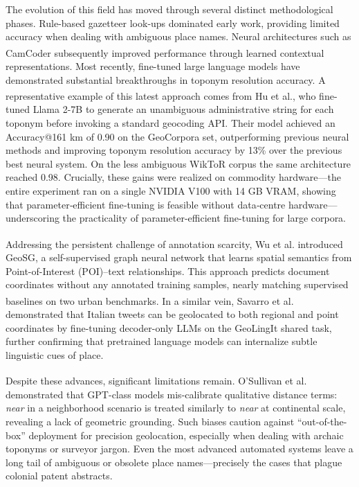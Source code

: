 \documentclass[
  10pt,
  twocolumn]{article}
\begin{document}
The evolution of this field has moved through several distinct
methodological phases. Rule-based gazetteer look-ups dominated early
work, providing limited accuracy when dealing with ambiguous place
names. Neural architectures such as
CamCoder\textsuperscript{}
subsequently improved performance through learned contextual
representations. Most recently, fine-tuned large language models have
demonstrated substantial breakthroughs in toponym resolution accuracy. A
representative example of this latest approach comes from Hu et
al.\textsuperscript{}, who
fine-tuned Llama 2-7B to generate an unambiguous administrative string
for each toponym before invoking a standard geocoding API. Their model
achieved an Accuracy@161 km of 0.90 on the GeoCorpora set, outperforming
previous neural methods and improving toponym resolution accuracy by
13\% over the previous best neural system. On the less ambiguous WikToR
corpus the same architecture reached 0.98. Crucially, these gains were
realized on commodity hardware---the entire experiment ran on a single
NVIDIA V100 with 14 GB VRAM, showing that parameter‑efficient
fine‑tuning is feasible without data‑centre hardware---underscoring the
practicality of parameter-efficient fine-tuning for large corpora.

Addressing the persistent challenge of annotation scarcity, Wu et
al.\textsuperscript{} introduced GeoSG, a
self-supervised graph neural network that learns spatial semantics from
Point-of-Interest (POI)--text relationships. This approach predicts
document coordinates without any annotated training samples, nearly
matching supervised baselines on two urban benchmarks. In a similar
vein, Savarro et
al.\textsuperscript{}
demonstrated that Italian tweets can be geolocated to both regional and
point coordinates by fine-tuning decoder-only LLMs on the GeoLingIt
shared task, further confirming that pretrained language models can
internalize subtle linguistic cues of place.

Despite these advances, significant limitations remain. O'Sullivan et
al.\textsuperscript{}
demonstrated that GPT-class models mis-calibrate qualitative distance
terms: \emph{near} in a neighborhood scenario is treated similarly to
\emph{near} at continental scale, revealing a lack of geometric
grounding. Such biases caution against ``out-of-the-box'' deployment for
precision geolocation, especially when dealing with archaic toponyms or
surveyor jargon. Even the most advanced automated systems leave a long
tail of ambiguous or obsolete place names---precisely the cases that
plague colonial patent abstracts.
\end{document}
